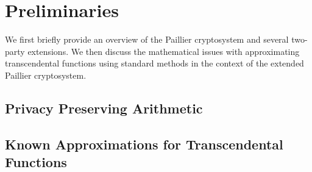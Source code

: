\section{Preliminaries}

We first briefly provide an overview of the Paillier cryptosystem and several two-party extensions. We then discuss the mathematical issues with approximating transcendental functions using standard methods in the context of the extended Paillier cryptosystem.


\subsection{Privacy Preserving Arithmetic}

\subsection{Known Approximations for Transcendental Functions}
